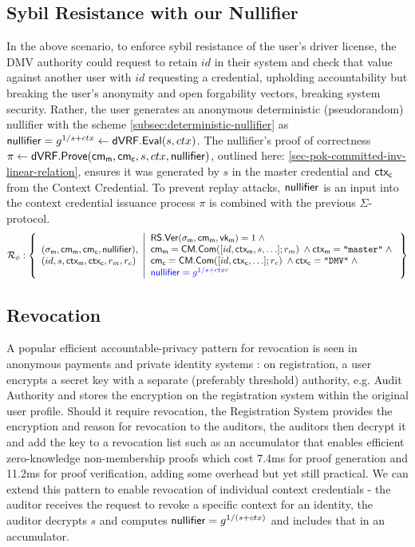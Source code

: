 \subsection*{Sybil Resistance with our Nullifier}
In the above scenario, to enforce sybil resistance of the user's driver license, the DMV authority could request to retain $id$ in their system and check that value against another user with $id$ requesting a credential, upholding accountability but breaking the user's anonymity and open forgability vectors, breaking system security. Rather, the user generates an anonymous deterministic (pseudorandom) nullifier with the scheme \ref{subsec:deterministic-nullifier} as $\mathsf{nullifier} = g^{1/s + ctx} \gets \mathsf{dVRF.Eval}(s, ctx)$. The nullifier's proof of correctness $\pi \gets \mathsf{dVRF.Prove}(\mathsf{cm_m}, \mathsf{cm_c}, s, ctx, \mathsf{nullifier})$, outlined here: \ref{sec-pok-committed-inv-linear-relation}, ensures it was generated by $s$ in the master credential and $\mathsf{ctx_c}$ from the Context Credential. To prevent replay attacks, $\mathsf{nullifier}$ is an input into the context credential issuance process $\pi$ is combined with the previous $\Sigma$-protocol. 
\[
\mathcal{R}_{\phi}: \left\{ 
\begin{array}{l}
(\sigma_{\mathsf{m}}, \mathsf{cm_m}, \mathsf{cm_c}, \mathsf{nullifier}), \\
(id, s, \mathsf{ctx_m}, \mathsf{ctx_c}, r_m, r_c) 
\end{array}
\middle| 
\begin{array}{lcl}
    \mathsf{RS.Ver}(\sigma_{\mathsf{m}}, \mathsf{cm_m}, \mathsf{vk_m}) = 1 \; \wedge \; \\
    \mathsf{cm_m} = \mathsf{CM.Com}([id, \mathsf{ctx_m}, s, \ldots]; r_m) \; \wedge \mathsf{ctx_m} = \texttt{"master"} \; \wedge \; \\
    \mathsf{cm_c} = \mathsf{CM.Com}([id, \mathsf{ctx_c}, \ldots]; r_c) \; \wedge \mathsf{ctx_c} = \texttt{"DMV"} \; \wedge \; \\
    \textcolor{blue}{\mathsf{nullifier} = g^{1/s + ctxc}}
\end{array} \right\}
\]




\subsection*{Revocation}
A popular efficient accountable-privacy pattern for revocation is seen in anonymous payments \cite{damgard_balancing_2020} and private identity systems \cite{wang_hades_2023}: on registration, a user encrypts a secret key with a separate (preferably threshold) authority, e.g. Audit Authority and stores the encryption on the registration system within the original user profile. Should it require revocation, the Registration System provides the encryption and reason for revocation to the auditors, the auditors then decrypt it and add the key to a revocation list such as an accumulator that enables efficient zero-knowledge non-membership proofs \cite{jaques_allosaur_2024, galbraith_dynamic_2022} which cost 7.4ms for proof generation and 11.2ms for proof verification, adding some overhead but yet still practical. We can extend this pattern to enable revocation of individual context credentials - the auditor receives the request to revoke a specific context for an identity, the auditor decrypts $s$ and computes $\mathsf{nullifier} = g^{1/(s + ctx)}$ and includes that in an accumulator.

